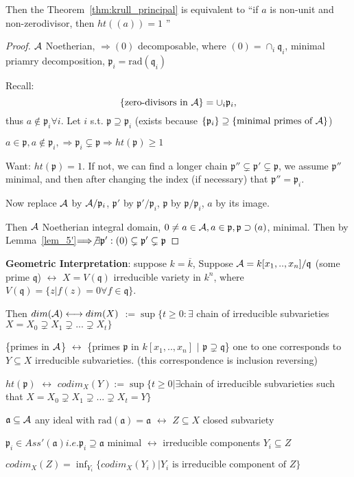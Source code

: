\documentclass[11pt]{article}
\newcommand{\sca}{{\mathfrak a}}
\newcommand{\scp}{{\mathfrak p}}
\newcommand{\scq}{\mathfrak q}
\newcommand{\cala}{{\cal A}}
\newcommand{\Lrta}{\Longrightarrow}
\newcommand{\llrta}{\longleftrightarrow}
\begin{document}
Then the Theorem~\ref{thm:krull_principal} is equivalent to 
``if $a$ is non-unit and non-zerodivisor, then $ht((a))=1$ ''
\begin{proof}
$\cala$ Noetherian, $\Lrta (0)$ decomposable, where $(0)=\cap_i\scq_i$, minimal priamry decomposition, $\scp_i=\text{rad}(\scq_i)$

Recall:
$$
\{\text{zero-divisors in }\cala\} =\cup_i\scp_i,
$$
thus $a\notin\scp_i\forall i$. Let $i$ s.t. $\scp\supseteq \scp_i$ (exists because $\{\scp_i\}\supseteq \{\text{minimal primes of $\cala$}\}$)

$a\in\scp ,a\notin \scp_i,\Lrta\scp_i\subsetneq \scp\Lrta ht(\scp)\geq 1$

Want: $ht(\scp)=1$. If not, we can find a longer chain $\scp''\subsetneq \scp'\subsetneq \scp$, we assume $\scp''$ minimal, and then after changing the index (if necessary) that $\scp''=\scp_i$.

Now replace
$\cala$ by $\cala/\scp_i$, $\scp'$ by $\scp'/\scp_i$, $\scp$ by $\scp/\scp_i$, $a$ by its image.

Then $\cala$ Noetherian integral domain, $0\neq a\in \cala,a\in\scp,\scp\supset(a)$, minimal.
Then by Lemma~\ref{lem_5'}$\Lrta \not \exists \scp':(0)\subsetneq \scp'\subsetneq \scp$
\end{proof}

\textbf{Geometric Interpretation}: suppose $k=\overline{k}$,
Suppose $\cala=k[x_1,..,x_n]/\scq$ (some prime $\scq$) $\llrta$ $X=V(\scq)$ irreducible variety in $k^n$, where $V(\scq)=\{z|f(z)=0\forall f\in\scq\}$.

Then $dim(\cala)\llrta dim(X)$ $:=\sup\{t\geq 0:\exists$ chain of irreducible subvarieties $ X=X_0\supsetneq X_1\supsetneq ...\supsetneq X_t\}$

\{primes in $\cala$\} $\llrta$ \{primes $\scp$ in $k[x_1,..,x_n]$ $|$ $\scp\supsetneq \scq$\} one to one corresponds to $Y\subseteq X$ irreducible subvarieties. (this correspondence is inclusion reversing)

$ht(\scp)$ $\llrta$ $codim_X(Y):=\sup\{t\geq 0|\exists $chain of irreducible subvarieties such that $X=X_0\supsetneq X_1\supsetneq ...\supsetneq X_t=Y\}$

$\sca\subseteq\cala$ any ideal with $\text{rad}(\sca)=\sca $ $\llrta$ $Z\subseteq X$ closed subvariety

$\scp_i\in Ass'(\sca) i.e. \scp_i\supseteq \sca$ minimal $\llrta$ irreducible components $Y_i\subseteq Z$

$codim_X(Z)=\inf_{Y_i}\{ codim_X(Y_i)| \text{$Y_i$ is irreducible component of $Z$}\}$
\end{document}
